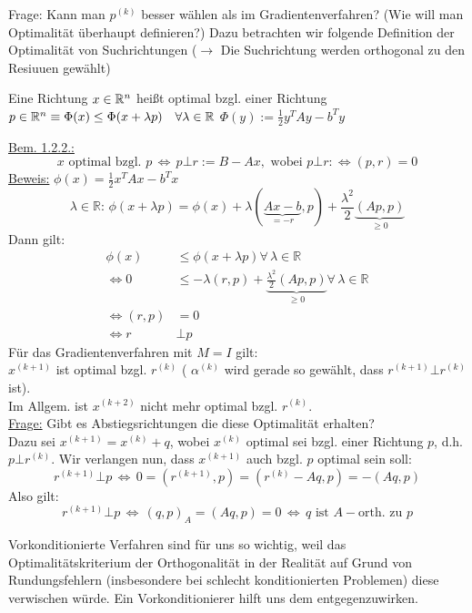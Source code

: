 Frage: Kann man $p^{(k)}$ besser wählen als im Gradientenverfahren? (Wie will man Optimalität überhaupt definieren?) Dazu betrachten wir folgende Definition der Optimalität von Suchrichtungen ($\to$ Die Suchrichtung werden orthogonal zu den Resiuuen gewählt)

\begin{definition}
  Eine Richtung $x\in \mathbb{R}^n$ heißt optimal bzgl. einer Richtung $p\in \mathbb{R}^n \equiv \Phi(x) \leq \Phi(x+\lambda p) \quad \forall \lambda \in \mathbb{R}$
  $\Phi(y):= \frac 1 2 y^TAy - b^Ty$
\end{definition}



\underline{Bem. 1.2.2.:}
\[ x \text{ optimal bzgl. } p \, \Leftrightarrow \, p \bot r := B-Ax, \text{ wobei } p \bot r : \Leftrightarrow (p,r)=0 \]
\underline{Beweis:} $ \phi (x)=\frac{1}{2} x^TAx-b^Tx $\\
\[ \lambda \in\mathbb{R} : \, \phi (x + \lambda p) = \phi(x) + \lambda (\underbrace{Ax-b}_{=-r},p)+ \frac{\lambda^2}{2}\underbrace{(Ap,p)}_{\geq 0} \]
Dann gilt:
\begin{align*}
  \phi(x) &\leq \phi(x+\lambda p ) \forall \, \lambda \in\mathbb{R} \\
  \Leftrightarrow 0 & \leq -\lambda (r,p)+\underbrace{\frac{\lambda^2}{2}(Ap,p)}_{\geq 0} \forall \, \lambda \in \mathbb{R} \\
  \Leftrightarrow (r,p) &=0 \\
  \Leftrightarrow r & \bot p
\end{align*}
Für das Gradientenverfahren mit $M=I$ gilt:\\
$x^{(k+1)}$ ist optimal bzgl. $r^{(k)}$ ( $\alpha^{(k)}$ wird gerade so gewählt, dass $r^{(k+1)} \bot r^{(k)}$ ist).\\
Im Allgem. ist $x^{(k+2)}$ nicht mehr optimal bzgl. $r^{(k)}$.\\
\underline{Frage:} Gibt es Abstiegsrichtungen die diese Optimalität erhalten?\\
Dazu sei $x^{(k+1)}=x^{(k)}+q$, wobei $x^{(k)}$ optimal sei bzgl. einer Richtung $p$, d.h. $p \bot r^{(k)}$. Wir verlangen nun, dass $x^{(k+1)}$ auch bzgl. $p$ optimal sein soll:
\[ r^{(k+1)} \bot p \, \Leftrightarrow \, 0 = (r^{(k+1)},p) = (r^{(k)}-Aq,p)=-(Aq,p) \]
Also gilt:
\[ r^{(k+1)} \bot p \, \Leftrightarrow \, (q,p)_A=(Aq,p)=0 \, \Leftrightarrow \, q \text{ ist $A-$orth. zu } p \]

\begin{bemerkung}
  Vorkonditionierte Verfahren sind für uns so wichtig, weil das Optimalitätskriterium der Orthogonalität in der Realität auf Grund von Rundungsfehlern (insbesondere bei schlecht konditionierten Problemen) diese verwischen würde. Ein Vorkonditionierer hilft uns dem entgegenzuwirken.
\end{bemerkung}

